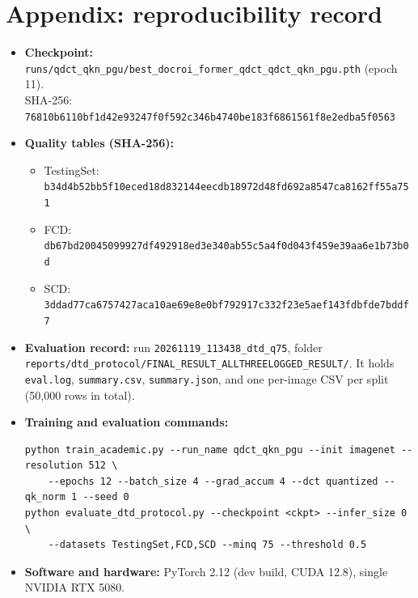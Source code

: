 \documentclass[10pt,a4paper]{article}
\begin{document}
\section*{Appendix: reproducibility record}
\begin{itemize}
  \item \textbf{Checkpoint:} \texttt{runs/qdct\_qkn\_pgu/best\_docroi\_former\_qdct\_qdct\_qkn\_pgu.pth}
        (epoch 11).\\ SHA-256: {\footnotesize\texttt{76810b6110bf1d42e93247f0f592c346}\allowbreak\texttt{b4740be183f6861561f8e2edba5f0563}}
  \item \textbf{Quality tables (SHA-256):}
  \begin{itemize}
    \item TestingSet: {\footnotesize\texttt{b34d4b52bb5f10eced18d832144eecdb}\allowbreak\texttt{18972d48fd692a8547ca8162ff55a751}}
    \item FCD: {\footnotesize\texttt{db67bd20045099927df492918ed3e340}\allowbreak\texttt{ab55c5a4f0d043f459e39aa6e1b73b0d}}
    \item SCD: {\footnotesize\texttt{3ddad77ca6757427aca10ae69e8e0bf7}\allowbreak\texttt{92917c332f23e5aef143fdbfde7bddf7}}
  \end{itemize}
  \item \textbf{Evaluation record:} run \texttt{20261119\_113438\_dtd\_q75}, folder\\
        \texttt{reports/dtd\_protocol/FINAL\_RESULT\_ALLTHREELOGGED\_RESULT/}. It holds
        \texttt{eval.log}, \texttt{summary.csv}, \texttt{summary.json}, and one
        per-image CSV per split (50{,}000 rows in total).
  \item \textbf{Training and evaluation commands:}
{\footnotesize
\begin{verbatim}
python train_academic.py --run_name qdct_qkn_pgu --init imagenet --resolution 512 \
    --epochs 12 --batch_size 4 --grad_accum 4 --dct quantized --qk_norm 1 --seed 0
python evaluate_dtd_protocol.py --checkpoint <ckpt> --infer_size 0 \
    --datasets TestingSet,FCD,SCD --minq 75 --threshold 0.5
\end{verbatim}
}
  \item \textbf{Software and hardware:} PyTorch 2.12 (dev build, CUDA 12.8), single NVIDIA
        RTX 5080.
\end{itemize}
\end{document}

